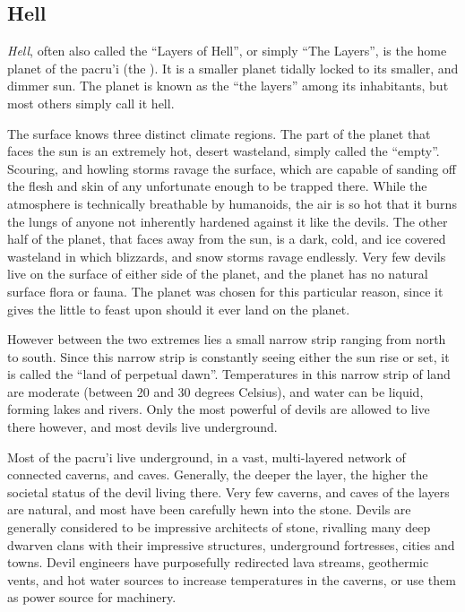 \subsection{Hell}
\label{sec:Hell}

\emph{Hell}, often also called the ``Layers of Hell'', or simply ``The
Layers'', is the home planet of the pacru'i (the ). It is
a smaller planet tidally locked to its smaller, and dimmer sun. The planet is
known as the ``the layers'' among its inhabitants, but most others simply call
it hell.

The surface knows three distinct climate regions. The part of the planet that
faces the sun is an extremely hot, desert wasteland, simply called the
``empty''. Scouring, and howling storms ravage the surface, which are capable of
sanding off the flesh and skin of any unfortunate enough to be trapped there.
While the atmosphere is technically breathable by humanoids, the air is so hot
that it burns the lungs of anyone not inherently hardened against it like the
devils. The other half of the planet, that faces away from the sun, is a dark,
cold, and ice covered wasteland in which blizzards, and snow storms ravage
endlessly. Very few devils live on the surface of either side of the planet,
and the planet has no natural surface flora or fauna. The planet was chosen for
this particular reason, since it gives the  little to feast
upon should it ever land on the planet.

However between the two extremes lies a small narrow strip ranging from north
to south. Since this narrow strip is constantly seeing either the sun rise or
set, it is called the ``land of perpetual dawn''. Temperatures in this narrow
strip of land are moderate (between 20 and 30 degrees Celsius), and water can
be liquid, forming lakes and rivers. Only the most powerful of devils are
allowed to live there however, and most devils live underground.

Most of the pacru'i live underground, in a vast, multi-layered network of
connected caverns, and caves. Generally, the deeper the layer, the higher the
societal status of the devil living there. Very few caverns, and caves of the
layers are natural, and most have been carefully hewn into the stone. Devils
are generally considered to be impressive architects of stone, rivalling many
deep dwarven clans with their impressive structures, underground fortresses,
cities and towns. Devil engineers have purposefully redirected lava streams,
geothermic vents, and hot water sources to increase temperatures in the
caverns, or use them as power source for machinery.

